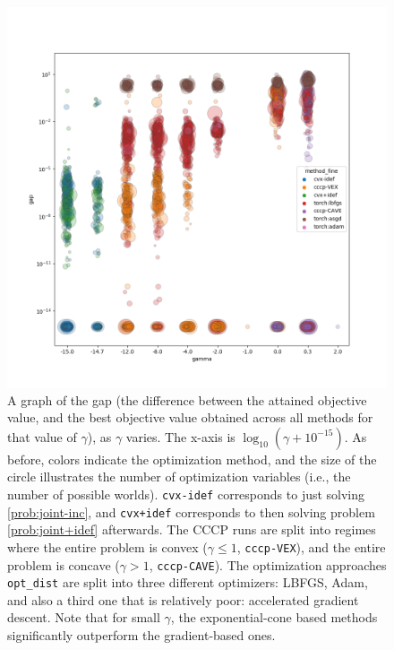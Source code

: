 \begin{figure}
    \includegraphics[width=\linewidth]{figs/2}
    \caption{
        A graph of the gap (the difference between the attained objective value, and the best objective value obtained across all methods for that value of $\gamma$),
        as $\gamma$ varies. The x-axis is $\log_{10} ( \gamma + 10^{-15})$.
        As before, colors indicate the optimization method, and
        the size of the circle illustrates the number of optimization variables (i.e., the number of possible worlds).
        \texttt{cvx-idef} corresponds to just solving \eqref{prob:joint-inc}, and \texttt{cvx+idef} corresponds to then solving problem \eqref{prob:joint+idef} afterwards.
        The CCCP runs are split into regimes where the entire problem is convex ($\gamma \le 1$, \texttt{cccp-VEX}), and the entire problem is concave ($\gamma > 1$, \texttt{cccp-CAVE}).
        The optimization approaches \texttt{opt\_dist} are split into three different optimizers: LBFGS, Adam, and also a third one that is relatively poor: accelerated gradient descent.
        Note that for small $\gamma$, the exponential-cone based methods significantly outperform the gradient-based ones.
    }\label{fig:gamma-v-gap-fine}
\end{figure}


